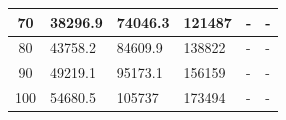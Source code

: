 \begin{table}[H]
\begin{tabular}{|c|l|l|l|l|l|}
70                                                                         & 38296.9                              & 74046.3                               & 121487                                & -                                     & -                                     \\ \hline
80                                                                         & 43758.2                              & 84609.9                               & 138822                                & -                                     & -                                     \\ \hline
90                                                                         & 49219.1                              & 95173.1                               & 156159                                & -                                     & -                                     \\ \hline
100                                                                        & 54680.5                              & 105737                                & 173494                                & -                                     & -                                     \\ \hline
\end{tabular}
\end{table}

